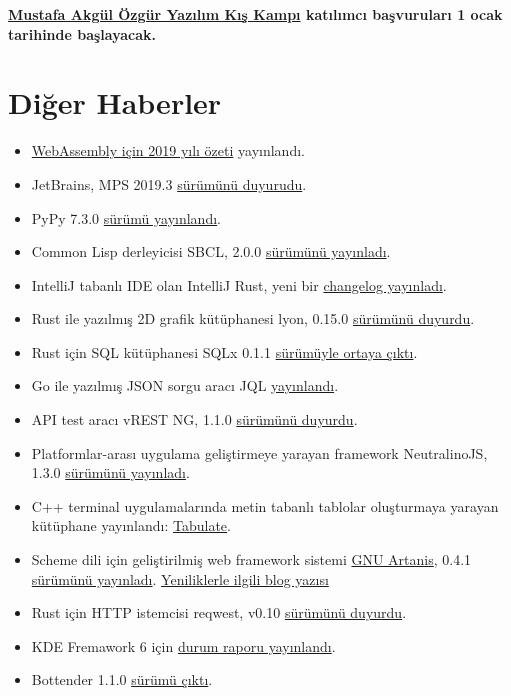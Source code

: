 \documentclass[11pt]{article}
\begin{document}
\textbf{\href{https://kamp.linux.org.tr/2020/kis/}{Mustafa Akgül Özgür Yazılım Kış Kampı} katılımcı başvuruları 1 ocak tarihinde
başlayacak.}
\section{Diğer Haberler}
\label{sec:org15fe850}
\begin{itemize}
\item \href{https://blog.scottlogic.com/2019/12/24/webassembly-2019.html}{WebAssembly için 2019 yılı özeti} yayınlandı.
\item JetBrains, MPS 2019.3 \href{https://blog.jetbrains.com/mps/2019/12/mps-2019-3-is-released/}{sürümünü duyurudu}.
\item PyPy 7.3.0 \href{https://morepypy.blogspot.com/2019/12/pypy-730-released.html}{sürümü yayınlandı}.
\item Common Lisp derleyicisi SBCL, 2.0.0 \href{http://www.sbcl.org/all-news.html?2.0.0\#2.0.0}{sürümünü yayınladı}.
\item IntelliJ tabanlı IDE olan IntelliJ Rust, yeni bir \href{https://intellij-rust.github.io/2019/12/30/changelog-113.html}{changelog yayınladı}.
\item Rust ile yazılmış 2D grafik kütüphanesi lyon, 0.15.0 \href{https://nical.github.io/posts/new-tessellator.html}{sürümünü duyurdu}.
\item Rust için SQL kütüphanesi SQLx 0.1.1 \href{https://github.com/launchbadge/sqlx?utm\_name=iossmf}{sürümüyle ortaya çıktı}.
\item Go ile yazılmış JSON sorgu aracı JQL \href{https://github.com/cube2222/jql}{yayınlandı}.
\item API test aracı vREST NG, 1.1.0 \href{https://ng.vrest.io/change-log}{sürümünü duyurdu}.
\item Platformlar-arası uygulama geliştirmeye yarayan framework NeutralinoJS,
1.3.0 \href{https://github.com/neutralinojs/neutralinojs/releases/tag/v1.3.0?utm\_name=iossmf}{sürümünü yayınladı}.
\item C++ terminal uygulamalarında metin tabanlı tablolar oluşturmaya yarayan
kütüphane yayınlandı: \href{https://github.com/p-ranav/tabulate}{Tabulate}.
\item Scheme dili için geliştirilmiş web framework sistemi \href{https://web-artanis.com/}{GNU Artanis}, 0.4.1
\href{https://lists.gnu.org/archive/html/artanis/2019-12/msg00000.html}{sürümünü yayınladı}. \href{https://nalaginrut.com/archives/2019/12/25/what\%2527s\%2520new\%2520in\%2520gnu\%2520artanis\%25200.4.1}{Yeniliklerle ilgili blog yazısı}
\item Rust için HTTP istemcisi reqwest, v0.10 \href{https://seanmonstar.com/post/189960517042/reqwest-v010}{sürümünü duyurdu}.
\item KDE Fremawork 6 için \href{https://ervin.ipsquad.net/blog/2019/12/28/kf6-progress-report-december-solstice-edition/}{durum raporu yayınlandı}.
\item Bottender 1.1.0 \href{https://bottender.js.org/blog/2019/12/27/bottender-1\_1}{sürümü çıktı}.
\end{itemize}
\end{document}
